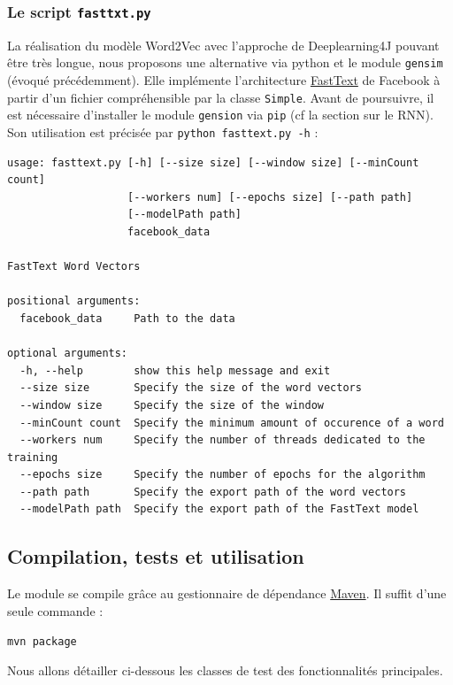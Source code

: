 \documentclass[10pt,a4paper]{article}
\begin{document}
\subsubsection{Le script \texttt{fasttxt.py}}
La réalisation du modèle Word2Vec avec l'approche de Deeplearning4J pouvant être très longue, nous proposons une alternative via python et le module \texttt{gensim} (évoqué précédemment). Elle implémente l'architecture \href{https://fasttext.cc/}{FastText} de Facebook à partir d'un fichier compréhensible par la classe \texttt{Simple}. Avant de poursuivre, il est nécessaire d'installer le module \texttt{gension} via \texttt{pip} (cf la section sur le RNN). Son utilisation est précisée par \texttt{python fasttext.py -h} :
\begin{verbatim}
usage: fasttext.py [-h] [--size size] [--window size] [--minCount count]
                   [--workers num] [--epochs size] [--path path]
                   [--modelPath path]
                   facebook_data

FastText Word Vectors

positional arguments:
  facebook_data     Path to the data

optional arguments:
  -h, --help        show this help message and exit
  --size size       Specify the size of the word vectors
  --window size     Specify the size of the window
  --minCount count  Specify the minimum amount of occurence of a word
  --workers num     Specify the number of threads dedicated to the training
  --epochs size     Specify the number of epochs for the algorithm
  --path path       Specify the export path of the word vectors
  --modelPath path  Specify the export path of the FastText model
\end{verbatim}
\subsection{Compilation, tests et utilisation}
Le module se compile grâce au gestionnaire de dépendance \href{https://maven.apache.org/}{Maven}. Il suffit d'une seule commande :
\begin{center}
	\texttt{mvn package}
\end{center}
Nous allons détailler ci-dessous les classes de test des fonctionnalités principales.
\end{document}
